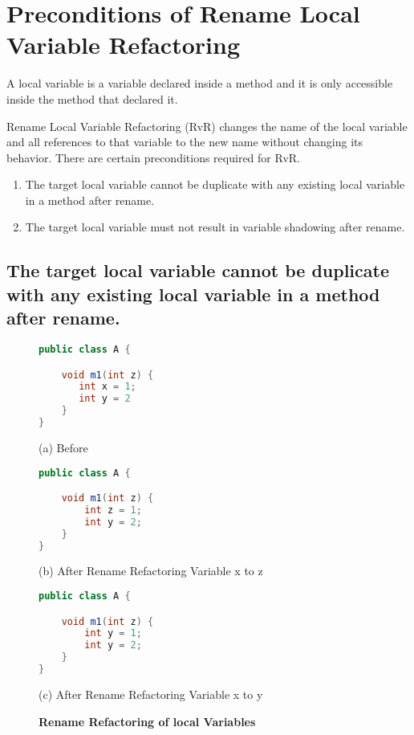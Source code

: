 \section{\textbf{Preconditions of Rename Local Variable Refactoring}}
A local variable is a variable declared inside a method and it is only accessible inside the method that declared it.

Rename Local Variable Refactoring (RvR) changes the name of the local variable and all references to that variable to the new name without changing its behavior. There are certain preconditions required for RvR.
\begin{enumerate}
\item The target local variable cannot be duplicate with any existing local variable in a method after rename.
\item The target local variable must not result in variable shadowing after rename.
\end{enumerate}

\subsection{The target local variable cannot be duplicate with any existing local variable in a method after rename.}

\begin{figure}[th]
\centering
\begin{minipage}[t]{0.45\linewidth}
\begin{lstlisting}[language=java, basicstyle=\scriptsize\ttfamily,frame=single]
public class A {

    void m1(int z) {
       int x = 1; 
       int y = 2
    }
}
\end{lstlisting}
\centering(a) Before
\end{minipage}
\hfill
\begin{minipage}[t]{0.45\linewidth}
\begin{lstlisting}[language=java, basicstyle=\scriptsize\ttfamily,frame=single]
public class A {

    void m1(int z) {
        int z = 1; 
        int y = 2;
    }
}
\end{lstlisting}
\centering(b) After Rename Refactoring Variable x to z
\end{minipage}

\centering
\begin{minipage}[t]{0.45\linewidth}
\begin{lstlisting}[language=java, basicstyle=\scriptsize\ttfamily,frame=single]
public class A {

    void m1(int z) {
        int y = 1; 
        int y = 2;
    }
}
\end{lstlisting}
\centering(c) After Rename Refactoring Variable x to y
\end{minipage}
\caption{\textbf{Rename Refactoring of local Variables}}
\label{figure:precond5_1}
\end{figure}

